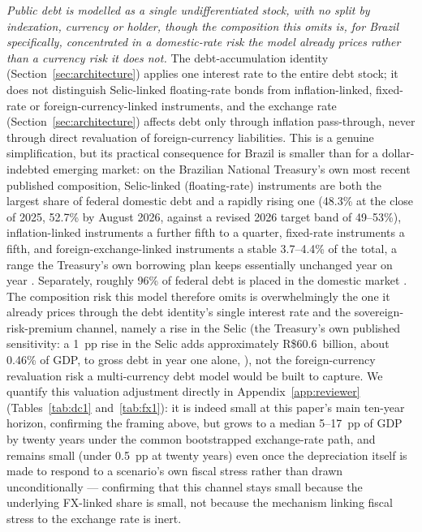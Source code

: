 \documentclass[11pt,a4paper]{article}
\begin{document}
\emph{Public debt is modelled as a single undifferentiated stock, with no split by indexation, currency or holder, though the composition this omits is, for Brazil specifically, concentrated in a domestic-rate risk the model already prices rather than a currency risk it does not.} The debt-accumulation identity (Section~\ref{sec:architecture}) applies one interest rate to the entire debt stock; it does not distinguish Selic-linked floating-rate bonds from inflation-linked, fixed-rate or foreign-currency-linked instruments, and the exchange rate (Section~\ref{sec:architecture}) affects debt only through inflation pass-through, never through direct revaluation of foreign-currency liabilities. This is a genuine simplification, but its practical consequence for Brazil is smaller than for a dollar-indebted emerging market: on the Brazilian National Treasury's own most recent published composition, Selic-linked (floating-rate) instruments are both the largest share of federal domestic debt and a rapidly rising one (48.3\% at the close of 2025, 52.7\% by August 2026, against a revised 2026 target band of 49--53\%), inflation-linked instruments a further fifth to a quarter, fixed-rate instruments a fifth, and foreign-exchange-linked instruments a stable 3.7--4.4\% of the total, a range the Treasury's own borrowing plan keeps essentially unchanged year on year \citep{tesourormd2026}. Separately, roughly 96\% of federal debt is placed in the domestic market \citep{tesourormd2026}. The composition risk this model therefore omits is overwhelmingly the one it already prices through the debt identity's single interest rate and the sovereign-risk-premium channel, namely a rise in the Selic (the Treasury's own published sensitivity: a 1~pp rise in the Selic adds approximately R\$60.6~billion, about 0.46\% of GDP, to gross debt in year one alone, \citealp{tesourormd2026}), not the foreign-currency revaluation risk a multi-currency debt model would be built to capture. We quantify this valuation adjustment directly in Appendix~\ref{app:reviewer} (Tables~\ref{tab:dc1} and~\ref{tab:fx1}): it is indeed small at this paper's main ten-year horizon, confirming the framing above, but grows to a median 5--17~pp of GDP by twenty years under the common bootstrapped exchange-rate path, and remains small (under 0.5~pp at twenty years) even once the depreciation itself is made to respond to a scenario's own fiscal stress rather than drawn unconditionally --- confirming that this channel stays small because the underlying FX-linked share is small, not because the mechanism linking fiscal stress to the exchange rate is inert.
\end{document}
